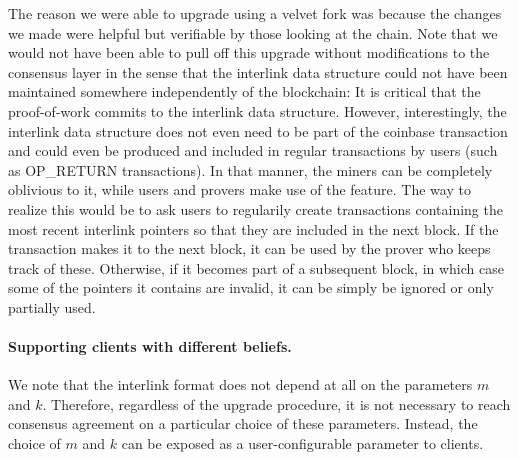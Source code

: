 The reason we were able to upgrade using a velvet fork was because the changes
we made were helpful but verifiable by those looking at the chain. Note that we
would not have been able to pull off this upgrade without modifications to the
consensus layer in the sense that the interlink data structure could not have
been maintained somewhere independently of the blockchain: It is critical that
the proof-of-work commits to the interlink data structure. However,
interestingly, the interlink data structure does not even need to be part of
the coinbase transaction and could even be produced and included in regular
transactions by users (such as OP\_RETURN transactions). In that manner, the
miners can be completely oblivious to it, while users and provers make use of
the feature. The way to realize this would be to ask users to regularily create
transactions containing the most recent interlink pointers so that they are
included in the next block. If the transaction makes it to the next block, it
can be used by the prover who keeps track of these. Otherwise, if it becomes
part of a subsequent block, in which case some of the pointers it contains are
invalid, it can be simply be ignored or only partially used.

%

\paragraph{Supporting clients with different beliefs.}
We note that the interlink format does not depend at all on the parameters $m$ and $k$.
Therefore, regardless of the upgrade procedure, it is not necessary to reach consensus agreement on a particular choice of these parameters. Instead, the choice of $m$ and $k$ can be exposed as a user-configurable parameter to clients.

